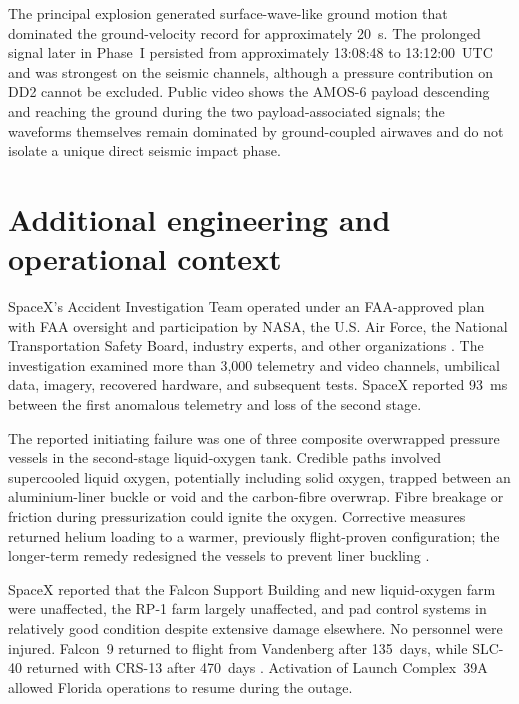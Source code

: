 \documentclass[]{seismica}
\begin{document}
The principal explosion generated surface-wave-like ground motion that
dominated the ground-velocity record for approximately 20~s. The prolonged
signal later in Phase~I persisted from approximately 13:08:48 to
13:12:00~UTC and was strongest on the seismic channels, although a pressure
contribution on DD2 cannot be excluded. Public video shows the AMOS-6 payload
descending and reaching the ground during the two payload-associated signals;
the waveforms themselves remain dominated by ground-coupled airwaves and do
not isolate a unique direct seismic impact phase.

\FloatBarrier

\section{Additional engineering and operational context}
\label{sec:supp_engineering}

SpaceX's Accident Investigation Team operated under an FAA-approved plan with
FAA oversight and participation by NASA, the U.S. Air Force, the National
Transportation Safety Board, industry experts, and other organizations
\citep{spacex_anomaly_2017,nasa_sma_falcon9}. The investigation examined more
than 3,000 telemetry and video channels, umbilical data, imagery, recovered
hardware, and subsequent tests. SpaceX reported 93~ms between the first
anomalous telemetry and loss of the second stage.

The reported initiating failure was one of three composite overwrapped pressure
vessels in the second-stage liquid-oxygen tank. Credible paths involved
supercooled liquid oxygen, potentially including solid oxygen, trapped between
an aluminium-liner buckle or void and the carbon-fibre overwrap. Fibre breakage
or friction during pressurization could ignite the oxygen. Corrective measures
returned helium loading to a warmer, previously flight-proven configuration;
the longer-term remedy redesigned the vessels to prevent liner buckling
\citep{spacex_anomaly_2017}.

SpaceX reported that the Falcon Support Building and new liquid-oxygen farm
were unaffected, the RP-1 farm largely unaffected, and pad control systems in
relatively good condition despite extensive damage elsewhere. No personnel
were injured. Falcon~9 returned to flight from Vandenberg after 135~days, while
SLC-40 returned with CRS-13 after 470~days
\citep{spacex_iridium1_2017,spacex_crs13_2017}. Activation of Launch
Complex~39A allowed Florida operations to resume during the outage.
\end{document}
